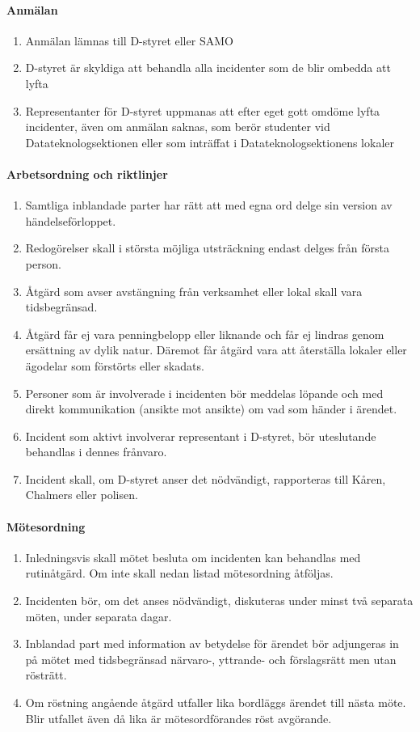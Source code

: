\documentclass{dtek}
\begin{document}
\paragraph{Anmälan}
\begin{enumerate}[resume]
  \item Anmälan lämnas till D-styret eller SAMO
  \item D-styret är skyldiga att behandla alla incidenter som de blir ombedda att lyfta
  \item Representanter för D-styret uppmanas att efter eget gott omdöme lyfta incidenter, även om anmälan saknas, som berör studenter vid Datateknologsektionen eller som inträffat i Datateknologsektionens lokaler
\end{enumerate}

\paragraph{Arbetsordning och riktlinjer}
\begin{enumerate}[resume]
  \item Samtliga inblandade parter har rätt att med egna ord delge sin version av händelseförloppet.
  \item Redogörelser skall i största möjliga utsträckning endast delges från första person.
  \item Åtgärd som avser avstängning från verksamhet eller lokal skall vara tidsbegränsad.
  \item Åtgärd får ej vara penningbelopp eller liknande och får ej lindras genom ersättning av dylik natur. Däremot får åtgärd vara att återställa lokaler eller ägodelar som förstörts eller skadats.
  \item Personer som är involverade i incidenten bör meddelas löpande och med direkt kommunikation (ansikte mot ansikte) om vad som händer i ärendet.
  \item Incident som aktivt involverar representant i D-styret, bör uteslutande behandlas i dennes frånvaro.
  \item Incident skall, om D-styret anser det nödvändigt, rapporteras till Kåren, Chalmers eller polisen.
\end{enumerate}

\paragraph{Mötesordning}
\begin{enumerate}[resume]
  \item Inledningsvis skall mötet besluta om incidenten kan behandlas med rutinåtgärd. Om inte skall nedan listad mötesordning åtföljas.
  \item Incidenten bör, om det anses nödvändigt, diskuteras under minst två separata möten, under separata dagar.
  \item Inblandad part med information av betydelse för ärendet bör adjungeras in på mötet med tidsbegränsad närvaro-, yttrande- och förslagsrätt men utan rösträtt.
  \item Om röstning angående åtgärd utfaller lika bordläggs ärendet till nästa möte. Blir utfallet även då lika är mötesordförandes röst avgörande.
\end{enumerate}
\end{document}
